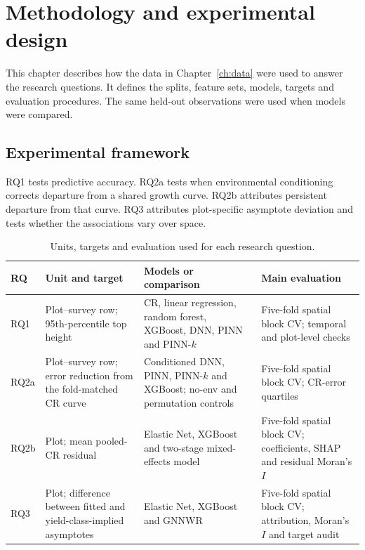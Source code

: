 
\chapter{Methodology and experimental design}
\label{ch:methodology}

This chapter describes how the data in Chapter~\ref{ch:data} were used to answer the research
questions. It defines the splits, feature sets, models, targets and evaluation procedures. The
same held-out observations were used when models were compared.

\section{Experimental framework}
\label{sec:method-framework}

RQ1 tests predictive accuracy. RQ2a tests when environmental conditioning corrects departure
from a shared growth curve. RQ2b attributes persistent departure from that curve. RQ3 attributes
plot-specific asymptote deviation and tests whether the associations vary over space.

\begin{table}[!htbp]
\centering
\scriptsize
\renewcommand{\arraystretch}{1.15}
\begin{tabular}{p{0.9cm}p{3.5cm}p{3.2cm}p{2.8cm}}
\toprule
RQ & Unit and target & Models or comparison & Main evaluation \\
\midrule
RQ1 & Plot--survey row; 95th-percentile top height & CR, linear regression, random forest,
XGBoost, DNN, PINN and PINN-$k$ & Five-fold spatial block CV; temporal and plot-level checks \\
RQ2a & Plot--survey row; error reduction from the fold-matched CR curve & Conditioned
DNN, PINN, PINN-$k$ and XGBoost; no-env and permutation controls & Five-fold spatial block
CV; CR-error quartiles \\
RQ2b & Plot; mean pooled-CR residual & Elastic Net, XGBoost and two-stage
mixed-effects model & Five-fold spatial block CV; coefficients, SHAP and residual Moran's $I$ \\
RQ3 & Plot; difference between fitted and yield-class-implied asymptotes & Elastic Net, XGBoost
and GNNWR & Five-fold spatial block CV; attribution, Moran's $I$ and target audit \\
\bottomrule
\end{tabular}
\caption{Units, targets and evaluation used for each research question.}
\label{tab:rq-framework}
\end{table}

